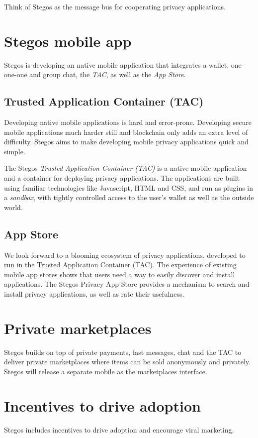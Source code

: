 \documentclass[8pt,fleqn,openany]{book}
\begin{document}
Think of Stegos as the message bus for cooperating privacy applications.

\section{Stegos mobile app}
Stegos is developing an native mobile application that integrates a wallet, one-one-one and group chat, the \textit{TAC}, as well as the \textit{App Store}.

\subsection{Trusted Application Container (TAC)}
Developing native mobile applications is hard and error-prone. Developing secure mobile applications much harder still and blockchain only adds an extra level of difficulty. Stegos aims to make developing mobile privacy applications quick and simple. 

The Stegos \textit{Trusted Application Container (TAC)} is a native mobile application and a container for deploying privacy applications. The applications are built using familiar technologies like Javascript, HTML and CSS, and run as plugins in a \textit{sandbox}, with tightly controlled access to the user's wallet as well as the outside world.

\subsection{App Store}
We look forward to a blooming ecosystem of privacy applications, developed to run in the Trusted Application Container (TAC). The experience of existing mobile app stores shows that users need a way to easily discover and install applications. The Stegos Privacy App Store provides a mechanism to search and install privacy applications, as well as rate their usefulness. 

\section{Private marketplaces}
Stegos builds on top of private payments, fast messages, chat and the TAC to deliver private marketplaces where items can be sold anonymously and privately. Stegos will release a separate mobile as the marketplaces interface. 

\section{Incentives to drive adoption}
Stegos includes incentives to drive adoption and encourage viral marketing. 
\end{document}
